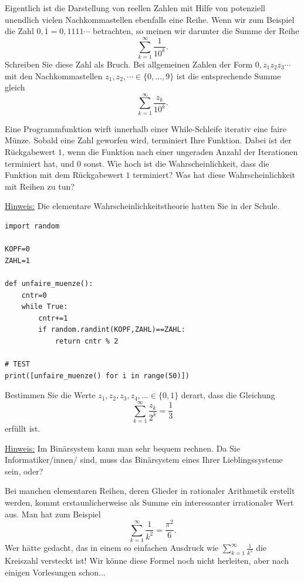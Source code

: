 \begin{bsp} 
	Eigentlich ist die Darstellung von reellen Zahlen mit Hilfe von potenziell unendlich vielen Nachkommastellen ebenfalls eine Reihe. Wenn wir zum Beispiel die Zahl $0{,}\overline{1} = 0{,}1111\cdots$ betrachten, so meinen wir darunter die Summe der Reihe
	\[
		\sum_{k=1}^\infty \frac{1}{10^k}. 
	\]
	Schreiben Sie diese Zahl als Bruch.
	Bei allgemeinen Zahlen der Form $0{,}z_1 z_2 z_3 \cdots$ mit den Nachkommastellen $z_1,z_2,\cdots \in \{0,\ldots, 9\}$ ist die entsprechende Summe gleich 
	\[
		\sum_{k=1}^\infty \frac{z_k}{10^k}. 
	\]
\end{bsp} 

\begin{aufg} 
	Eine Programmfunktion wirft innerhalb einer While-Schleife iterativ eine faire Münze. Sobald eine Zahl geworfen wird, terminiert Ihre Funktion. Dabei ist der Rückgabewert $1$, wenn die Funktion nach einer ungeraden Anzahl der Iterationen terminiert hat, und $0$ sonst. Wie hoch ist die Wahrscheinlichkeit, dass die Funktion mit dem Rückgabewert $1$ terminiert? Was hat diese Wahrscheinlichkeit mit Reihen zu tun? 
	
	\underline{Hinweis:} Die elementare Wahrscheinlichkeitstheorie hatten Sie in der Schule. 
	
\begin{lstlisting} 
import random

KOPF=0
ZAHL=1

def unfaire_muenze():
	cntr=0
	while True: 
		cntr+=1
		if random.randint(KOPF,ZAHL)==ZAHL:
			return cntr % 2

# TEST
print([unfaire_muenze() for i in range(50)])
\end{lstlisting} 
	
\end{aufg} 

\begin{aufg} 
	Bestimmen Sie die Werte $z_1,z_2, z_3, z_4, \ldots \in \{0,1\}$ derart, dass die Gleichung 
	\[
		\sum_{k=1}^\infty \frac{z_k}{2^k}  = \frac{1}{3}
	\]
	erfüllt ist. 
	
	\underline{Hinweis:} Im Binärsystem kann man sehr bequem rechnen. Da Sie Informatiker/innen/ sind, muss das Binärsystem eines Ihrer Lieblingssysteme sein, oder? 
\end{aufg} 



\begin{bsp}
	Bei manchen elementaren Reihen, deren Glieder in rationaler Arithmetik erstellt werden, kommt erstaunlicherweise als Summe ein interessanter irrationaler Wert aus. Man hat zum Beispiel 
	\[
		\sum_{k=1}^\infty \frac{1}{k^2} = \frac{\pi^2}{6}. 
	\] 
	Wer hätte gedacht, das in einem so einfachen Ausdruck wie $\sum_{k=1}^\infty \frac{1}{k^2}$ die Kreiszahl versteckt ist! Wir könne diese Formel noch nicht herleiten, aber nach einigen Vorlesungen schon... 
\end{bsp} 

